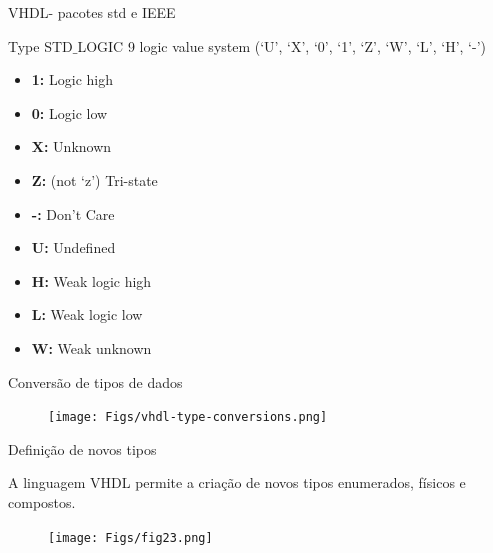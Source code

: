 \documentclass[aspectratio=169]{beamer}
\begin{document}
\begin{frame}{VHDL- pacotes std e IEEE}
	\justifying
	
	\begin{block}{Type STD$\_$LOGIC}
		9 logic value system (‘U’, ‘X’, ‘0’, ‘1’, ‘Z’, ‘W’, ‘L’, ‘H’, ‘-’)
		
	\begin{itemize}
	\item \textbf{1:} Logic high    
	\item \textbf{0:} Logic low
	\item \textbf{X:} Unknown
	\item \textbf{Z:} (not ‘z’) Tri-state
	\item \textbf{-:} Don’t Care
	\item \textbf{U:} Undefined
	\item \textbf{H:} Weak logic high
	\item \textbf{L:} Weak logic low
	\item \textbf{W:} Weak unknown
	\end{itemize}		
		
		
	\end{block}

	
\end{frame}
\begin{frame}{Conversão de tipos de dados}
	\justifying
	
	
	
	\begin{figure}[h]
		\centering
		\texttt{[image: Figs/vhdl-type-conversions.png]}
	\end{figure}	
	
\end{frame}
\begin{frame}{Definição de novos tipos}
	\justifying
	
	\begin{block}{}
	\justifying
	A linguagem VHDL permite a criação de novos tipos enumerados, físicos e compostos.
	\end{block}		
	
	\begin{figure}[h]
		\centering
		\texttt{[image: Figs/fig23.png]}
	\end{figure}
	
\end{frame}
\end{document}
